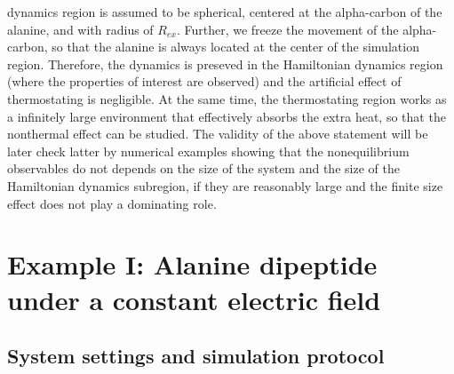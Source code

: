 \documentclass[a4paper,preprint,unsortedaddress,onecolumn]{revtex4-1}
\begin{document}
dynamics region is assumed to be spherical, centered at the
alpha-carbon of the alanine, and with radius of $R_{ex}$.  Further, we
freeze the movement of the alpha-carbon, so that the alanine is always
located at the center of the simulation region.
Therefore, the dynamics is preseved in the Hamiltonian dynamics region (where the properties of interest are observed)
and the artificial effect of thermostating is negligible.
At the same time, the thermostating region works as a infinitely large
environment that effectively absorbs the extra heat, so that
the nonthermal effect can be studied.
The validity of the above
statement will be later check latter by numerical examples showing that the
nonequilibrium observables do not depends on the size of the system
and the size of the Hamiltonian dynamics subregion, if they are
reasonably large and the finite size effect does not play a dominating role.



\section{Example I: Alanine dipeptide
  under a constant electric field}

\subsection{System settings and simulation protocol}
\end{document}
